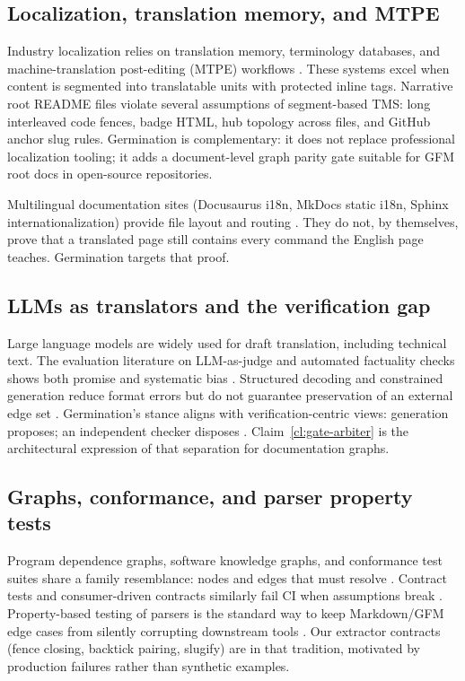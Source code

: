 \documentclass[11pt]{article}
\theoremstyle{definition}
\theoremstyle{plain}
\theoremstyle{remark}
\begin{document}
\subsection{Localization, translation memory, and MTPE}

Industry localization relies on translation memory, terminology databases,
and machine-translation post-editing (MTPE) workflows
\citep{iso17100,taas2014}. These systems excel when content is segmented
into translatable units with protected inline tags. Narrative root README
files violate several assumptions of segment-based TMS: long interleaved
code fences, badge HTML, hub topology across files, and GitHub anchor
slug rules. Germination is complementary: it does not replace professional
localization tooling; it adds a document-level graph parity gate suitable
for GFM root docs in open-source repositories.

Multilingual documentation sites (Docusaurus i18n, MkDocs static i18n,
Sphinx internationalization) provide file layout and routing
\citep{docusaurus-i18n}. They do not, by themselves, prove that a translated
page still contains every command the English page teaches. Germination
targets that proof.

\subsection{LLMs as translators and the verification gap}

Large language models are widely used for draft translation, including
technical text. The evaluation literature on LLM-as-judge and automated
factuality checks shows both promise and systematic bias
\citep{zheng2023judging,factscore}. Structured decoding and constrained
generation reduce format errors but do not guarantee preservation of an
external edge set \citep{willard2023outlines}. Germination's stance aligns
with verification-centric views: generation proposes; an independent checker
disposes \citep{karlsson2023}. Claim~\ref{cl:gate-arbiter} is the
architectural expression of that separation for documentation graphs.

\subsection{Graphs, conformance, and parser property tests}

Program dependence graphs, software knowledge graphs, and conformance test
suites share a family resemblance: nodes and edges that must resolve
\citep{ferrante1987,graph4code}. Contract tests and consumer-driven
contracts similarly fail CI when assumptions break
\citep{pact}. Property-based testing of parsers is the standard way to keep
Markdown/GFM edge cases from silently corrupting downstream tools
\citep{claessen2000,commonmark}. Our extractor contracts (fence closing,
backtick pairing, slugify) are in that tradition, motivated by production
failures rather than synthetic examples.
\end{document}
